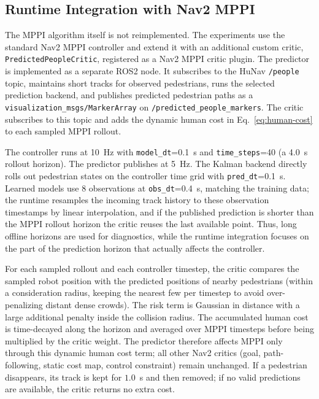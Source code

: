 \documentclass[12pt, a4paper]{article}
\begin{document}
\subsection{Runtime Integration with Nav2 MPPI}

The MPPI algorithm itself is not reimplemented. The experiments use the standard Nav2 MPPI controller and extend it with an additional custom critic, \texttt{PredictedPeopleCritic}, registered as a Nav2 MPPI critic plugin. The predictor is implemented as a separate ROS2 node. It subscribes to the HuNav \texttt{/people} topic, maintains short tracks for observed pedestrians, runs the selected prediction backend, and publishes predicted pedestrian paths as a \texttt{visualization\_msgs/MarkerArray} on \texttt{/predicted\_people\_markers}. The critic subscribes to this topic and adds the dynamic human cost in Eq.~\eqref{eq:human-cost} to each sampled MPPI rollout.

The controller runs at 10~Hz with \texttt{model\_dt}=0.1~s and \texttt{time\_steps}=40 (a 4.0~s rollout horizon). The predictor publishes at 5~Hz. The Kalman backend directly rolls out pedestrian states on the controller time grid with \texttt{pred\_dt}=0.1~s. Learned models use $8$ observations at \texttt{obs\_dt}=0.4~s, matching the training data; the runtime resamples the incoming track history to these observation timestamps by linear interpolation, and if the published prediction is shorter than the MPPI rollout horizon the critic reuses the last available point. Thus, long offline horizons are used for diagnostics, while the runtime integration focuses on the part of the prediction horizon that actually affects the controller.

For each sampled rollout and each controller timestep, the critic compares the sampled robot position with the predicted positions of nearby pedestrians (within a consideration radius, keeping the nearest few per timestep to avoid over-penalizing distant dense crowds). The risk term is Gaussian in distance with a large additional penalty inside the collision radius. The accumulated human cost is time-decayed along the horizon and averaged over MPPI timesteps before being multiplied by the critic weight. The predictor therefore affects MPPI only through this dynamic human cost term; all other Nav2 critics (goal, path-following, static cost map, control constraint) remain unchanged. If a pedestrian disappears, its track is kept for $1.0$~s and then removed; if no valid predictions are available, the critic returns no extra cost.
\end{document}
